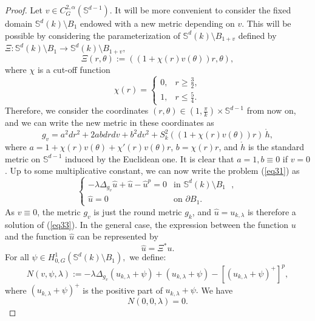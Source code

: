 \documentclass[reqno]{amsart}
\numberwithin{equation}{section}
\newenvironment{key words}{\textbf{Keywords}\mbox{  }}{ }
\begin{document}
\begin{proof}
 Let $v\in C_{G}^{2,\alpha}(\mathbb{S}^{d-1})$. It will be more convenient to consider the fixed domain $\mathbb{S}^{d}(k)\setminus B_{1}$ endowed with a new metric depending on $v$. This will be possible by considering the parameterization of $\mathbb{S}^{d}(k)\setminus B_{1+v}$ defined by $\Xi:\mathbb{S}^{d}(k)\setminus B_{1}\rightarrow\mathbb{S}^{d}(k)\setminus B_{1+v},$
	\begin{equation}\label{eq32}
	\Xi(r,\theta):=\left(\left(1+\chi(r)v(\theta)\right)r,\theta\right),
	\end{equation}
	where $\chi$ is a cut-off function
	\begin{equation*}
	 \chi(r)=
	\begin{cases}
	0, &r \geq\frac{3}{2},\\
	1, &r \leq\frac{5}{4}.
	\end{cases}
	\end{equation*}	
	Therefore, we consider the coordinates $(r,\theta)\in \left(1,\frac{\pi}{k}\right)\times\mathbb{S}^{d-1}$ from now on, and we can write the new metric in these coordinates as
\[g_{v}=a^{2}dr^{2}+2abdrdv+b^{2}dv^{2}+S^{2}_{k}\left(\left(1+\chi(r)v(\theta)\right)r\right)\, \mathring{h} ,\]
where $a=1+\chi(r)v(\theta)+\chi'(r)v(\theta)r$, $b=\chi(r)r$, and $\mathring{h}$ is the standard metric on $\mathbb{S}^{d-1}$ induced by the Euclidean one. It is clear that $a=1,b\equiv 0$ if $v=0$. Up to some multiplicative constant, we can now write the problem (\ref{eq31}) as
	\begin{equation}\label{eq33}
	\begin{cases}
-\lambda\Delta_{g_{v}} \hat{u}+\hat{u}-\hat{u}^{p}=0 &\mbox{in $\mathbb{S}^{d}(k)\setminus B_{1}$ },\\
	\hat{u}=0 &\mbox{on $\partial B_{1}$}.
	\end{cases}
	\end{equation}
	As $v\equiv0$, the metric $g_{v}$ is just the round metric $g_{k}$, and $\hat{u}=u_{k,  \lambda}$ is therefore a solution of (\ref{eq33}).  In the general case, the expression between the function $u$ and the function $\hat{u}$ can be represented by
	\[\hat{u}=\Xi^{*}u.\]
	For all $\psi\in H_{0,G}^{1}(\mathbb{S}^{d}(k)\setminus B_{1}),$ we define:
	\begin{equation} \label{eq34} N(v,\psi,\lambda):=-\lambda\Delta_{g_{v}}(u_{k,\lambda}+\psi)+(u_{k, \lambda}+\psi)-[(u_{k, \lambda}+\psi)^{+}]^{p},\end{equation}
	where $(u_{k, \lambda}+\psi)^{+}$ is the positive part of $u_{k,\lambda}+\psi.$ We have\[N(0,0,\lambda)=0.\]

\end{proof}
\end{document}
